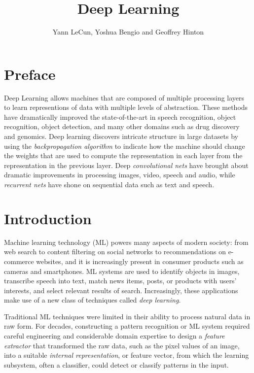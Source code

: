 \documentclass[10pts]{article}
\title{Deep Learning}
\author{Yann LeCun, Yoshua Bengio and Geoffrey Hinton}
\date{}
\begin{document}
\maketitle
\vspace*{-6mm}

\section{Preface}

Deep Learning allows machines that are composed of multiple processing 
layers to learn representions of data with multiple levels of abstraction.
These methods have dramatically improved the state-of-the-art
in speech recognition, object recognition, object detection,
and many other domains such as drug discovery and genomics. Deep
learning discovers intricate structure in large datasets by using the
{\em backpropagation algorithm} to indicate how the machine should
change the weights that are used to compute the representation in each layer from
the representation in the previous layer.  Deep {\em convolutional nets}
have brought about dramatic improvements in processing
images, video, speech and audio, while {\em recurrent
  nets} have shone on sequential data such as text and
speech.

\section{Introduction}

Machine learning technology (ML) powers many aspects of modern
society: from web search to content filtering on social networks 
to recommendations on e-commerce websites, and it is increasingly
present in consumer products such as cameras and smartphones. ML
systems are used to identify objects in images, transcribe speech into
text, match news items, posts, or products with users' interests, and
select relevant results of search. Increasingly, these applications
make use of a new class of techniques called {\em deep learning}.

Traditional ML techniques were limited in their ability to process
natural data in raw form. For decades, constructing a pattern
recognition or ML system required careful engineering and considerable
domain
expertise to design a {\em feature extractor} that transformed the raw
data, such as the pixel values of an image, into a suitable {\em
  internal representation}, or feature vector, from which the learning
subsystem, often a classifier, could detect or classify
patterns in the input.
\end{document}
